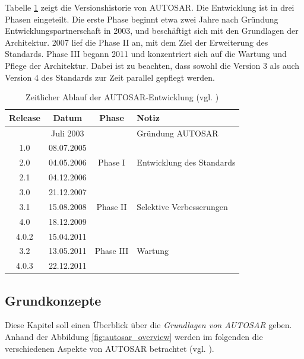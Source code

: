 \documentclass[
  a4paper,					    %
  twoside,
  DIV=calc,     				%
  bibliography=totoc,
  cleardoublepage=empty,
  ngerman,     					%
  final       					%
]{scrbook}
\begin{document}
Tabelle \ref{tab:timeline} zeigt die Versionshistorie von AUTOSAR. Die Entwicklung ist in drei Phasen eingeteilt. Die erste Phase beginnt etwa zwei Jahre nach Gründung Entwicklungspartnerschaft in 2003, und beschäftigt sich mit den Grundlagen der Architektur. 2007 lief die Phase II an, mit dem Ziel der Erweiterung des Standards. Phase III begann 2011 und konzentriert sich auf die Wartung und Pflege der Architektur. Dabei ist zu beachten, dass sowohl die Version 3 als auch Version 4 des Standards zur Zeit parallel gepflegt werden.

\begin{table}[h]
    \centering
    \begin{tabular}[h]{c c c l}
    \toprule
    Release & Datum & Phase & Notiz\\
    \midrule
          & Juli 2003  &  & Gründung AUTOSAR\\
    \midrule
    1.0   & 08.07.2005 & \multirow{3}{*}{Phase I} & \\
    2.0	  & 04.05.2006 &  & Entwicklung des Standards\\
    2.1	  & 04.12.2006 &  & \\
    \midrule
    3.0	  & 21.12.2007 & \multirow{3}{*}{Phase II} & \\
    3.1	  & 15.08.2008 &  & Selektive Verbesserungen\\
    4.0	  & 18.12.2009 &  & \\
    \midrule
    4.0.2 & 15.04.2011 & \multirow{3}{*}{Phase III} & \\
    3.2	  & 13.05.2011 &  & Wartung\\
    4.0.3 & 22.12.2011 &  & \\
    \bottomrule
    \end{tabular}
    \caption{Zeitlicher Ablauf der AUTOSAR-Entwicklung (vgl. \cite{as_background}\cite{as_roadmap}\cite{wiki:autosar_de})}
    \label{tab:timeline}
\end{table}








\subsection{Grundkonzepte}
\label{sec:Grundkonzepte}
Diese Kapitel soll einen Überblick über die \emph{Grundlagen von AUTOSAR} geben. Anhand der Abbildung \ref{fig:autosar_overview} werden im folgenden die verschiedenen Aspekte von AUTOSAR betrachtet (vgl. \cite{autosar_techoverview}).
\end{document}
